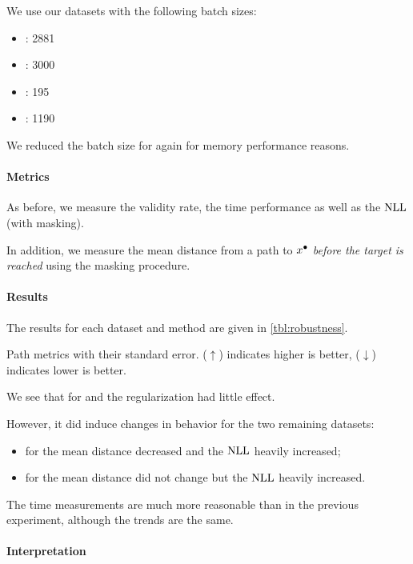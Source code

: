 \documentclass[../main.tex]{subfiles}
\begin{document}
We use our datasets with the following batch sizes:
\begin{itemize}
    \item \CakeOnSea: 2881
    \item \ForestCover: 3000
    \item \WineQuality: 195
    \item \OnlineNewsPopularity: 1190
\end{itemize}
We reduced the batch size for \ForestCover{} again for memory performance reasons.

\paragraph{Metrics}

As before, we measure the validity rate, the time performance as well as the $\text{NLL}$ (with masking).

In addition, we measure the mean distance from a path to $x^\bullet$ \emph{before the target is reached}
using the masking procedure.

\paragraph{Results}

The results for each dataset and method are given in \autoref{tbl:robustness}.

\begin{table}[h!]
    \centering
    
    \caption{Path metrics with their standard error. ($\uparrow$) indicates higher is better, ($\downarrow$) indicates lower is better.}
    \label{tbl:robustness}
\end{table}

We see that for \CakeOnSea{} and \WineQuality the regularization had little effect.

However, it did induce changes in behavior for the two remaining datasets:
\begin{itemize}
    \item for \ForestCover{} the mean distance decreased and the $\text{NLL}$ heavily increased;
    \item for \OnlineNewsPopularity{} the mean distance did not change but the $\text{NLL}$ heavily increased.
\end{itemize}

The time measurements are much more reasonable than in the previous experiment, although the trends are the same.

\paragraph{Interpretation}
\end{document}
